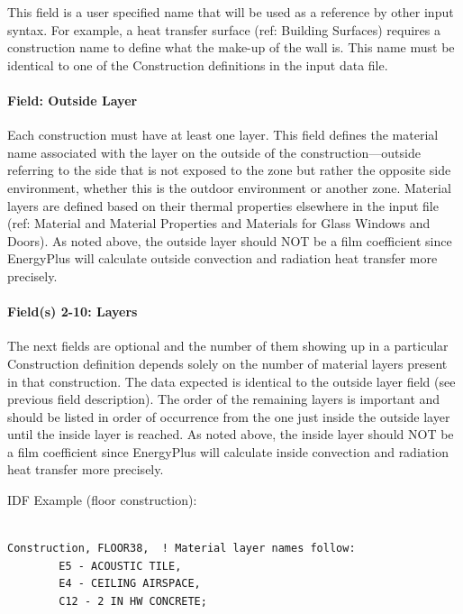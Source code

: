 This field is a user specified name that will be used as a reference by other input syntax. For example, a heat transfer surface (ref: Building Surfaces) requires a construction name to define what the make-up of the wall is. This name must be identical to one of the Construction definitions in the input data file.

\paragraph{Field: Outside Layer}\label{field-outside-layer}

Each construction must have at least one layer. This field defines the material name associated with the layer on the outside of the construction---outside referring to the side that is not exposed to the zone but rather the opposite side environment, whether this is the outdoor environment or another zone. Material layers are defined based on their thermal properties elsewhere in the input file (ref: Material and Material Properties and Materials for Glass Windows and Doors). As noted above, the outside layer should NOT be a film coefficient since EnergyPlus will calculate outside convection and radiation heat transfer more precisely.

\paragraph{Field(s) 2-10: Layers}\label{fields-2-10-layers}

The next fields are optional and the number of them showing up in a particular Construction definition depends solely on the number of material layers present in that construction. The data expected is identical to the outside layer field (see previous field description). The order of the remaining layers is important and should be listed in order of occurrence from the one just inside the outside layer until the inside layer is reached. As noted above, the inside layer should NOT be a film coefficient since EnergyPlus will calculate inside convection and radiation heat transfer more precisely.

IDF Example (floor construction):

\begin{lstlisting}

Construction, FLOOR38,  ! Material layer names follow:
        E5 - ACOUSTIC TILE,
        E4 - CEILING AIRSPACE,
        C12 - 2 IN HW CONCRETE;
\end{lstlisting}

